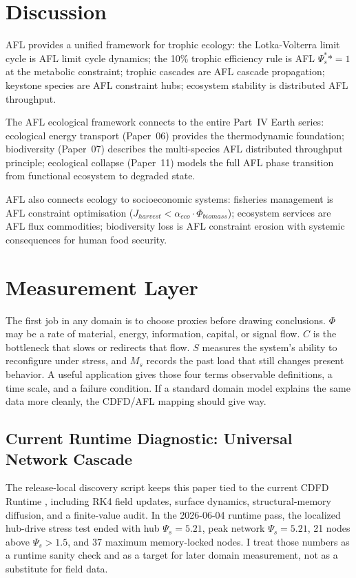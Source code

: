 \documentclass[11pt]{article}
\begin{document}
\section{Discussion}

AFL provides a unified framework for trophic ecology: the Lotka-Volterra limit cycle is AFL
limit cycle dynamics; the 10\% trophic efficiency rule is AFL $\Psi_s^** = 1$ at the metabolic
constraint; trophic cascades are AFL cascade propagation; keystone species are AFL constraint
hubs; ecosystem stability is distributed AFL throughput.

The AFL ecological framework connects to the entire Part~IV Earth series: ecological energy
transport (Paper~06) provides the thermodynamic foundation; biodiversity (Paper~07) describes
the multi-species AFL distributed throughput principle; ecological collapse (Paper~11) models
the full AFL phase transition from functional ecosystem to degraded state.

AFL also connects ecology to socioeconomic systems: fisheries management is AFL constraint
optimisation ($J_{harvest} < \alpha_{eco} \cdot \Phi_{biomass}$); ecosystem services are AFL
flux commodities; biodiversity loss is AFL constraint erosion with systemic consequences for
human food security.



\section{Measurement Layer}

The first job in any domain is to choose proxies before drawing conclusions. $\Phi$ may be a rate of material, energy, information, capital, or signal flow. $C$ is the bottleneck that slows or redirects that flow. $S$ measures the system's ability to reconfigure under stress, and $M_s$ records the past load that still changes present behavior. A useful application gives those four terms observable definitions, a time scale, and a failure condition. If a standard domain model explains the same data more cleanly, the CDFD/AFL mapping should give way.

\subsection{Current Runtime Diagnostic: Universal Network Cascade}
The release-local discovery script keeps this paper tied to the current CDFD Runtime \cite{CDFDRuntime2026}, including RK4 field updates, surface dynamics, structural-memory diffusion, and a finite-value audit. In the 2026-06-04 runtime pass, the localized hub-drive stress test ended with hub $\Psi_s=5.21$, peak network $\Psi_s=5.21$, 21 nodes above $\Psi_s>1.5$, and 37 maximum memory-locked nodes. I treat those numbers as a runtime sanity check and as a target for later domain measurement, not as a substitute for field data.
\end{document}
